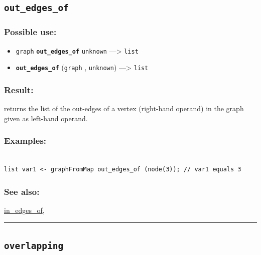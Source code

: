 \documentclass[]{book}
\providecommand{\tightlist}{%
  \setlength{\itemsep}{0pt}\setlength{\parskip}{0pt}}
\theoremstyle{definition}
\theoremstyle{definition}
\theoremstyle{definition}
\theoremstyle{remark}
\begin{document}
\subsection{\texorpdfstring{\texttt{out\_edges\_of}}{out\_edges\_of}}\label{out_edges_of}

\subsubsection{Possible use:}\label{possible-use-389}

\begin{itemize}
\tightlist
\item
  \texttt{graph} \textbf{\texttt{out\_edges\_of}} \texttt{unknown}
  ---\textgreater{} \texttt{list}
\item
  \textbf{\texttt{out\_edges\_of}} (\texttt{graph} , \texttt{unknown})
  ---\textgreater{} \texttt{list}
\end{itemize}

\subsubsection{Result:}\label{result-375}

returns the list of the out-edges of a vertex (right-hand operand) in
the graph given as left-hand operand.

\subsubsection{Examples:}\label{examples-267}

\begin{verbatim}
 
list var1 <- graphFromMap out_edges_of (node(3)); // var1 equals 3
\end{verbatim}

\subsubsection{See also:}\label{see-also-155}

\href{operators-i-to-m.html\#in_edges_of}{in\_edges\_of},

\begin{center}\rule{0.5\linewidth}{\linethickness}\end{center}

\subsection{\texorpdfstring{\texttt{overlapping}}{overlapping}}\label{overlapping}
\end{document}
